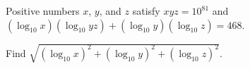 Positive numbers $ x$, $ y$, and $ z$ satisfy $ xyz = 10^{81}$ and $ (\log_{10}x)(\log_{10} yz) + (\log_{10}y) (\log_{10}z) = 468$.

Find $ \sqrt {(\log_{10}x)^2 + (\log_{10}y)^2 + (\log_{10}z)^2}$.
